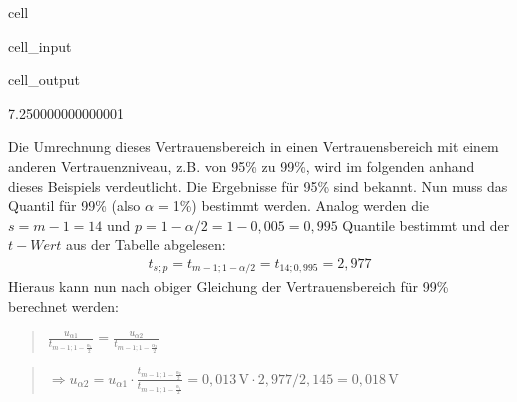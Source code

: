 \documentclass[letterpaper,10pt,english]{jupyterBook}
\begin{document}
\begin{sphinxuseclass}{cell}\begin{sphinxVerbatimInput}

\begin{sphinxuseclass}{cell_input}
\begin{sphinxVerbatim}[commandchars=\\\{\}]
\end{sphinxVerbatim}

\end{sphinxuseclass}\end{sphinxVerbatimInput}
\begin{sphinxVerbatimOutput}

\begin{sphinxuseclass}{cell_output}
\begin{sphinxVerbatim}[commandchars=\\\{\}]
7.250000000000001 \PYGZpc{}
\end{sphinxVerbatim}

\end{sphinxuseclass}\end{sphinxVerbatimOutput}

\end{sphinxuseclass}
\sphinxAtStartPar
Die Umrechnung dieses Vertrauensbereich in einen Vertrauensbereich mit einem anderen Vertrauenzniveau, z.B. von 95\% zu 99\%, wird im folgenden anhand dieses Beispiels verdeutlicht. Die Ergebnisse für 95\% sind bekannt. Nun muss das Quantil für 99\% (also \(\alpha = \)1\%) bestimmt werden. Analog werden die \(s = m-1 = 14\) und \(p = 1-\alpha/2 = 1-0,005 = 0,995\) Quantile bestimmt und der \(t-Wert\) aus der Tabelle abgelesen:
\begin{equation*}
\begin{split}t_{s;p} = t_{m-1; 1-\alpha/2} = t_{14; 0,995} = 2,977\end{split}
\end{equation*}
\sphinxAtStartPar
Hieraus kann nun nach obiger Gleichung der Vertrauensbereich für 99\% berechnet werden:
\begin{quote}

\sphinxAtStartPar
\(\frac{u_{\alpha 1}}{t_{m-1; 1-\frac{\alpha_1}{2}}} =  \frac{u_{\alpha 2}}{t_{m-1; 1-\frac{\alpha_2}{2}}}\)
\end{quote}
\begin{quote}

\sphinxAtStartPar
\(\Rightarrow u_{\alpha 2} = u_{\alpha 1} \cdot \frac{t_{m-1; 1-\frac{\alpha_2}{2}}}{t_{m-1; 1-\frac{\alpha_1}{2}}} = 0,013\,\mathrm V \cdot 2,977 / 2,145 = 0,018\,\mathrm V\)
\end{quote}
\end{document}

